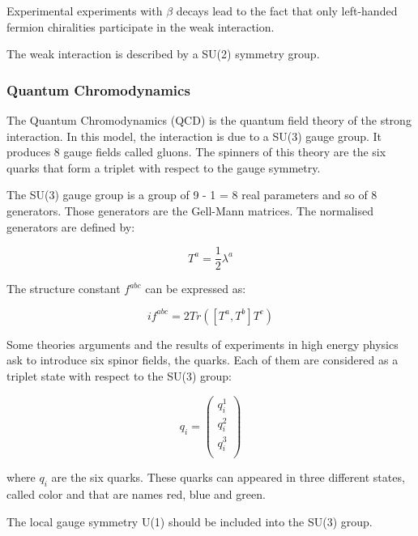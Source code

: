     Experimental experiments with $\beta$ decays lead to the fact that only left-handed fermion chiralities participate in the weak interaction.

    The weak interaction is described by a SU(2) symmetry group. 

    
      \subsubsection{Quantum Chromodynamics}
    The Quantum Chromodynamics (QCD) is the quantum field theory of the strong interaction.
    In this model, the interaction is due to a SU(3) gauge group. 
    It produces 8 gauge fields called gluons.
    The spinners of this theory are the six quarks that form a triplet with respect to the gauge symmetry.

    The SU(3) gauge group is a group of 9 - 1 = 8 real parameters and so of 8 generators. 
    Those generators are the Gell-Mann matrices. 
    The normalised generators are defined by: 
    
    \begin{equation}
        T^a = \frac{1}{2}\lambda^a
    \end{equation}

    The structure constant $f^{abc}$ can be expressed as:

    \begin{equation}
        if^{abc} = 2 Tr([T^a,T^b]T^c)
    \end{equation}
     
   Some theories arguments and the results of experiments in high energy physics ask to introduce six spinor fields, the quarks.
   Each of them are considered as a triplet state with respect to the SU(3) group:

   \begin{equation}
        q_i = \begin{pmatrix}
                q_i^1 \\
                q_i^2 \\
                q_i^3 \\
              \end{pmatrix}
   \end{equation}
    
    where $q_i$ are the six quarks.
    These quarks can appeared in three different states, called color and that are names red, blue and green.

    The local gauge symmetry U(1) should be included into the SU(3) group.
    
